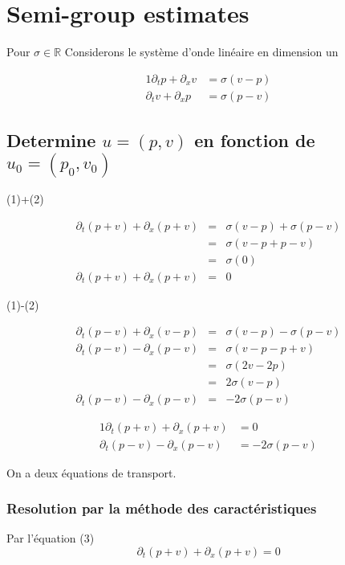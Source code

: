 \documentclass[a4paper,11pt]{article}
\begin{document}
\section{Semi-group estimates}
Pour \( \sigma \in \mathbb{R} \)
Considerons le système d'onde linéaire en dimension un

\begin{alignat}{1}
    \partial_{t}p + \partial_{x}v &= \sigma(v-p) \\
    \partial_{t}v + \partial_{x}p &= \sigma(p-v)
\end{alignat}

\subsection{Determine \( u = (p, v) \) en fonction de \( u_{0} = (p_{0}, v_{0}) \)}
(1)+(2)

\begin{equation*}
    \begin{array}{rcl}
        \partial_{t}(p+v) + \partial_{x}(p+v) &=& \sigma(v-p) + \sigma(p-v) \\
        &=& \sigma(v-p + p-v) \\
        &=& \sigma(0) \\
        \partial_{t}(p+v) + \partial_{x}(p+v) &=& 0
    \end{array}
\end{equation*}

(1)-(2)

\begin{equation*}
\begin{array}{rcl}
    \partial_{t}(p-v) + \partial_{x}(v-p) &=& \sigma(v-p) - \sigma(p-v) \\
    \partial_{t}(p-v) - \partial_{x}(p-v) &=& \sigma(v-p - p+v) \\
    &=& \sigma(2v-2p) \\
    &=& 2\sigma(v-p) \\
    \partial_{t}(p-v) - \partial_{x}(p-v) &=& -2\sigma(p-v)
\end{array}
\end{equation*}

\begin{alignat}{1}
    \partial_{t}(p+v) + \partial_{x}(p+v) &= 0 \\
    \partial_{t}(p-v) - \partial_{x}(p-v) &= -2\sigma(p-v)
\end{alignat}

On a deux équations de transport.

\subsubsection*{Resolution par la méthode des caractéristiques}
Par l'équation (3) 
\begin{equation*}
\partial_{t}(p+v) + \partial_{x}(p+v) = 0 
\end{equation*}
\end{document}

